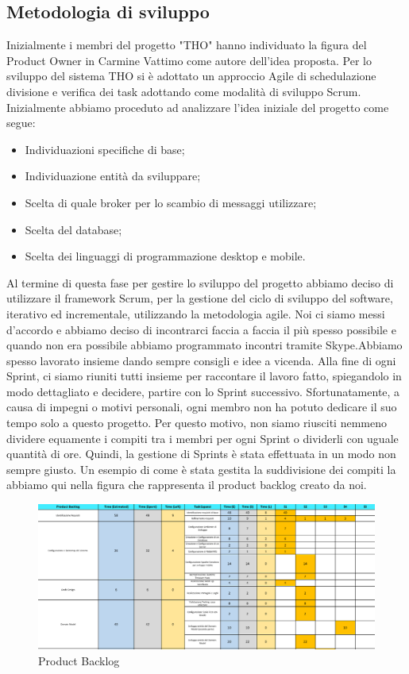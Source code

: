\documentclass[12pt, italian]{article}
\begin{document}
\subsection{Metodologia di sviluppo}
Inizialmente i membri del progetto "THO" hanno individuato la figura del Product Owner in Carmine Vattimo come autore dell'idea proposta. Per lo sviluppo del sistema THO si è adottato un approccio Agile di schedulazione divisione e verifica dei task adottando come modalità di sviluppo Scrum. 
\\ Inizialmente abbiamo proceduto ad analizzare l'idea iniziale del progetto come segue:
\begin{itemize}
	\item Individuazioni specifiche di base;
	\item Individuazione entità da sviluppare;
	\item Scelta di quale broker per lo scambio di messaggi utilizzare;
	\item Scelta del database;
	\item Scelta dei linguaggi di programmazione desktop e mobile.
\end{itemize}

Al termine di questa fase per gestire lo sviluppo del progetto abbiamo deciso di utilizzare il framework Scrum, per la gestione del ciclo di sviluppo del software, iterativo ed incrementale, utilizzando la metodologia agile. Noi ci siamo messi d'accordo e abbiamo deciso di incontrarci faccia a faccia il più spesso possibile e quando non era possibile abbiamo programmato incontri tramite Skype.Abbiamo spesso lavorato insieme dando sempre consigli e idee a vicenda. 
Alla fine di ogni Sprint, ci siamo riuniti tutti insieme per raccontare il lavoro fatto, spiegandolo in modo dettagliato e decidere, partire con lo Sprint successivo. Sfortunatamente, a causa di impegni o motivi personali, ogni membro non ha potuto dedicare il suo tempo solo a questo progetto. Per questo motivo, non siamo riusciti nemmeno dividere equamente i
compiti tra i membri per ogni Sprint o dividerli con uguale quantità di ore. Quindi, la gestione di Sprints è stata effettuata in un modo non sempre giusto.
Un esempio di come è stata gestita la suddivisione dei compiti la abbiamo qui nella figura che rappresenta il product backlog creato da noi.

\begin{figure}[H]
    \centering
    \includegraphics[width=1\textwidth]{img/backlog01.png}
    \caption{Product Backlog}
\end{figure}
\end{document}
